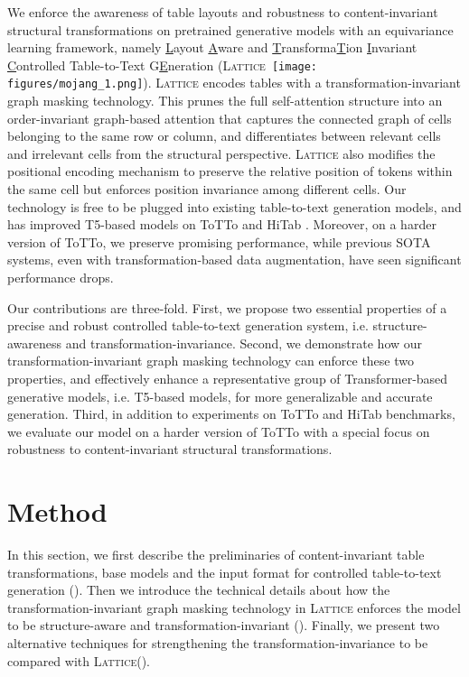 \documentclass[11pt]{article}
\newcommand{\model}{\mbox{\textsc{Lattice}}\xspace}
\newcommand{\mojang}{\texttt{[image: figures/mojang\_1.png]}}
\begin{document}
We enforce the awareness of table layouts and robustness to content-invariant structural transformations on pretrained generative models with an equivariance learning framework, namely \textsc{\underline{L}}ayout \textsc{\underline{A}}ware and \textsc{\underline{T}}ransforma\textsc{\underline{T}}ion \textsc{\underline{I}}nvariant \textsc{\underline{C}}ontrolled Table-to-Text G\textsc{\underline{E}}neration (\model~\mojang).
\model encodes tables with a transformation-invariant graph masking technology. 
This prunes the full self-attention structure into an order-invariant graph-based attention that captures the connected graph of cells belonging to the same row or column, and differentiates between relevant cells and irrelevant cells from the structural perspective. 
\model also modifies the positional encoding mechanism to preserve the relative position of tokens within the same cell but enforces position invariance among different cells.
Our technology is free to be plugged into existing table-to-text generation models, and has improved T5-based models \citep{raffel2020exploring} on ToTTo \citep{parikh2020totto} and HiTab \citep{cheng2021hitab}. Moreover, on a harder version of ToTTo, we preserve promising performance, while previous SOTA systems, even with transformation-based data augmentation, have seen significant performance drops.

Our contributions are three-fold.
First, we propose two essential properties of a precise and robust controlled table-to-text generation system, i.e. structure-awareness and transformation-invariance.
Second, we demonstrate how our transformation-invariant graph masking technology can enforce these two properties, and effectively enhance a representative group of Transformer-based generative models, i.e. T5-based models, for more generalizable and accurate generation.
Third, in addition to experiments on ToTTo and HiTab benchmarks, we evaluate our model on a harder version of ToTTo with a special focus on robustness to content-invariant structural transformations.
 \section{Method}
In this section, we first describe the preliminaries of content-invariant table transformations, base models and the input format for controlled table-to-text generation (). 
Then we introduce the technical details about how the transformation-invariant graph masking technology in \model enforces the model to be structure-aware and transformation-invariant (). 
Finally, we present two alternative techniques for strengthening the transformation-invariance to be compared with \model (). 
\end{document}
